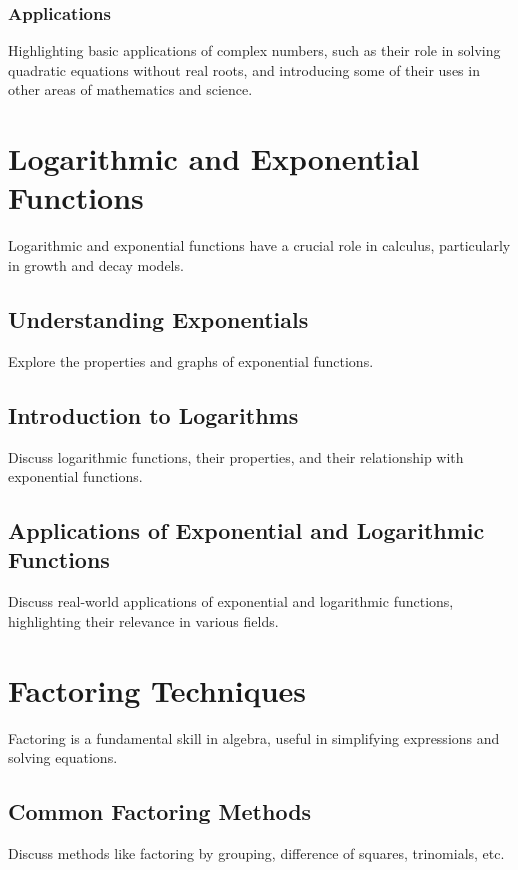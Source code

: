 \documentclass[a4paper,12pt]{book}
\begin{document}
\subsubsection{Applications}
Highlighting basic applications of complex numbers, such as their role in solving quadratic equations without real roots, and introducing some of their uses in other areas of mathematics and science.


\section{Logarithmic and Exponential Functions}
\label{sec:logarithmic_exponential}
Logarithmic and exponential functions have a crucial role in calculus, particularly in growth and decay models.


\subsection{Understanding Exponentials}
\label{subsec:understanding_exponentials}
Explore the properties and graphs of exponential functions.


\subsection{Introduction to Logarithms}
\label{subsec:introduction_to_logarithms}
Discuss logarithmic functions, their properties, and their relationship with exponential functions.


\subsection{Applications of Exponential and Logarithmic Functions}
\label{subsec:applications_exp_log_functions}
Discuss real-world applications of exponential and logarithmic functions, highlighting their relevance in various fields.


\section{Factoring Techniques}
\label{sec:factoring_techniques}
Factoring is a fundamental skill in algebra, useful in simplifying expressions and solving equations.


\subsection{Common Factoring Methods}
\label{subsec:common_factoring_methods}
Discuss methods like factoring by grouping, difference of squares, trinomials, etc.
\end{document}
